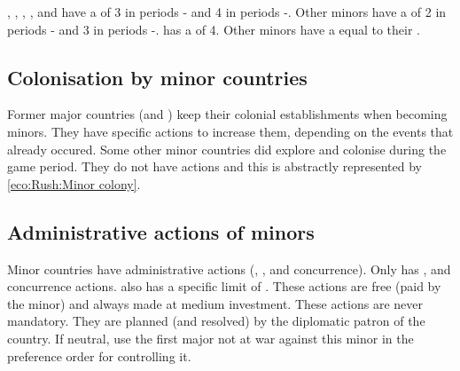 

 \paysPortugal, \paysVenise, \paysGenes,
\paysSuede, \paysDanemark and \paysHollande have a \FTI of 3 in periods
- and 4 in periods -.
\bparag Other minors have a \FTI of 2 in periods - and 3
in periods -.
\bparag \paysHollande has a \DTI of 4.
Other minors have a \DTI equal to their \FTI.



\subsection{Colonisation by minor countries}

\aparag Former major countries (\paysPortugal and \paysVenise) keep their
colonial establishments when becoming minors. They have specific actions to
increase them, depending on the events that already occured.
\bparag Some other minor countries did explore and colonise during the game
period. They do not have actions and this is abstractly represented by
\ref{eco:Rush:Minor colony}.



\subsection{Administrative actions of minors}

\aparag Minor countries have administrative actions (\TFI, \COL, \TP and
concurrence).
\bparag Only \paysPortugal has \COL, \TP and concurrence actions. \paysVenise
also has a specific limit of \TFI.
\bparag These actions are free (paid by the minor) and always made at medium
investment.
\bparag These actions are never mandatory.
\bparag They are planned (and resolved) by the diplomatic patron of the
country. If neutral, use the first major not at war against this minor in the
preference order for controlling it.

